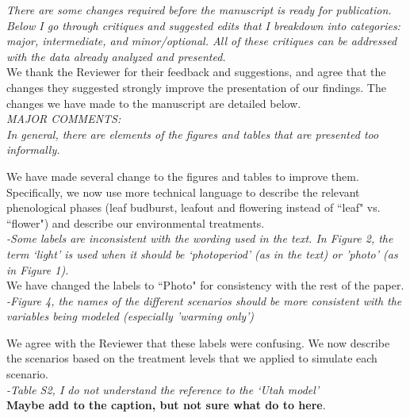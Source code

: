 \documentclass[11pt]{article}
\begin{document}
\emph{There are some changes required before the manuscript is ready for publication. Below I go through critiques and suggested edits that I breakdown into categories: major, intermediate, and minor/optional. All of these critiques can be addressed with the data already analyzed and presented.}\\

We thank the Reviewer for their feedback and suggestions, and agree that the changes they suggested strongly improve the presentation of our findings. The changes we have made to the manuscript are detailed below.\\

\emph{MAJOR COMMENTS:\\
In general, there are elements of the figures and tables that are presented too informally.}

We have made several change to the figures and tables to improve them. Specifically, we now use more technical language to describe the relevant phenological phases (leaf budburst, leafout and flowering instead of ``leaf" vs. ``flower") and describe our environmental treatments.  \\

\emph{-Some labels are inconsistent with the wording used in the text. In Figure 2, the term `light' is used when it should be `photoperiod' (as in the text) or 'photo' (as in Figure 1).}\\

\noindent We have changed the labels to ``Photo" for consistency with the rest of the paper.\\

\emph{-Figure 4, the names of the different scenarios should be more consistent with the variables being modeled (especially 'warming only')}

\noindent We agree with the Reviewer that these labels were confusing. We now describe the scenarios based on the treatment levels that we applied to simulate each scenario.\\

\emph{-Table S2, I do not understand the reference to the `Utah model'}\\

\textbf{Maybe add to the caption, but not sure what do to here}.\\
\end{document}
